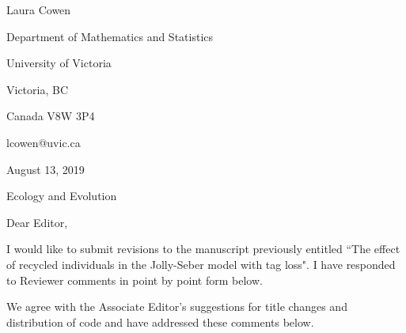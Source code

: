 \documentclass[12pt]{article}
\begin{document}
\setlength{\textheight}{575pt} \setlength{\baselineskip}{23pt}

\noindent\tiny Laura Cowen

\noindent Department of Mathematics and Statistics

\noindent University of Victoria

\noindent Victoria, BC

\noindent Canada V8W 3P4

\noindent lcowen@uvic.ca

\bigskip

\bigskip

\noindent \normalsize August 13, 2019
\bigskip





\noindent Ecology and Evolution


\bigskip


\bigskip
\noindent Dear Editor,

\bigskip

I would like to submit revisions to the manuscript previously entitled ``The effect of recycled individuals in the Jolly-Seber model with tag loss".  I have responded to Reviewer comments in point by point form below. 

\bigskip

We agree with the Associate Editor's suggestions for title changes and distribution of code and have addressed these comments below.

\begin{enumerate}
\end{enumerate}

\begin{enumerate}
\end{enumerate}

\begin{enumerate}
\end{enumerate}
\end{document}
